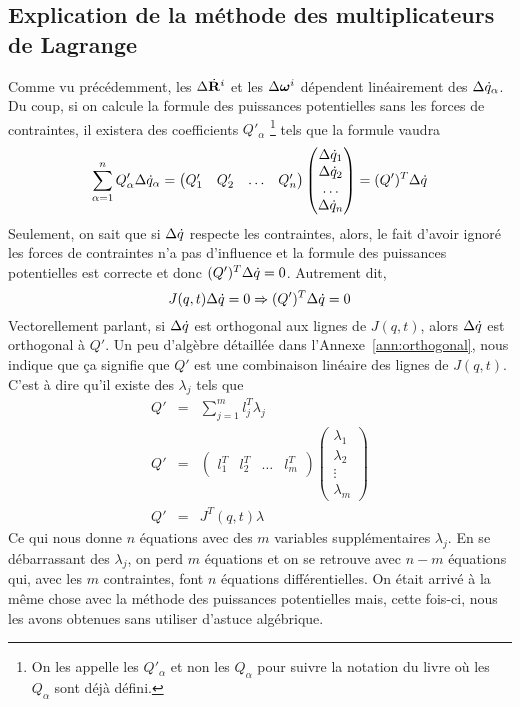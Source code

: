 \subsection{Explication de la méthode des multiplicateurs de Lagrange}
Comme vu précédemment, les $\Delta \dot{\bf R}^i$ et les $\Delta {\bm \omega}^i$ dépendent linéairement des $\Delta \dot{q}_\alpha$.
Du coup, si on calcule la formule des puissances potentielles sans les forces de contraintes, il existera des coefficients $Q'_\alpha$
\footnote{On les appelle les $Q'_\alpha$ et non les $Q_\alpha$ pour suivre la notation du livre où les $Q_\alpha$ sont déjà défini.}
tels que la formule vaudra
\[ \sum_{\alpha = 1}^n Q'_\alpha \Delta \dot{q}_\alpha =
\begin{pmatrix}Q'_1 & Q'_2 & \ldots & Q'_n\end{pmatrix}\begin{pmatrix}\Delta \dot{q}_1\\\Delta \dot{q}_2\\\ldots\\\Delta \dot{q}_n\end{pmatrix}
= (Q')^T \Delta \dot{q} \]
Seulement, on sait que si $\Delta \dot{q}$ respecte les contraintes, alors, le fait d'avoir ignoré les forces de contraintes n'a pas d'influence et la formule des puissances potentielles est correcte et donc $(Q')^T \Delta \dot{q} = 0$.
Autrement dit,
\[ J(q, t) \Delta \dot{q} = 0 \Rightarrow (Q')^T \Delta \dot{q} = 0 \]
Vectorellement parlant, si $\Delta \dot{q}$ est orthogonal aux lignes de $J(q, t)$, alors $\Delta \dot{q}$ est orthogonal à $Q'$.
Un peu d'algèbre détaillée dans l'Annexe~\ref{ann:orthogonal}, nous indique que ça signifie que $Q'$ est une combinaison linéaire des lignes de $J(q, t)$.
C'est à dire qu'il existe des $\lambda_j$ tels que
\begin{eqnarray*}
  Q' &=& \sum_{j = 1}^m l_j^T \lambda_j\\
Q' &=& \begin{pmatrix}l_1^T&l_2^T&\ldots&l_m^T\end{pmatrix} \begin{pmatrix}\lambda_1\\\lambda_2\\\vdots\\\lambda_m\end{pmatrix}\\
  Q' &=& J^T(q, t) \lambda
\end{eqnarray*}
Ce qui nous donne $n$ équations avec des $m$ variables supplémentaires $\lambda_j$.
En se débarrassant des $\lambda_j$, on perd $m$ équations et on se retrouve avec $n - m$ équations qui, avec les $m$ contraintes, font $n$ équations différentielles.
On était arrivé à la même chose avec la méthode des puissances potentielles mais, cette fois-ci, nous les avons obtenues sans utiliser d'astuce algébrique.

